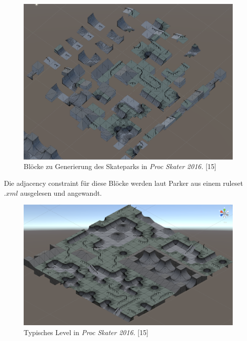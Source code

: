 \documentclass[12pt]{report}
\begin{document}
\begin{figure}[H]
    \centering
    \includegraphics[width=1\linewidth]{images/proc-skater-ruleset.png}%
    \caption{Blöcke zu Generierung des Skateparks in \textit{Proc Skater 2016.} {[15]}}%
\end{figure}

Die adjacency constraint für diese Blöcke werden laut Parker aus einem ruleset $.xml$ ausgelesen und angewandt.

\begin{figure}[H]
    \centering
    \includegraphics[width=1\linewidth]{images/proc-skate-level.png}%
    \caption{Typisches Level in \textit{Proc Skater 2016.} {[15]}}%
\end{figure}
\end{document}
